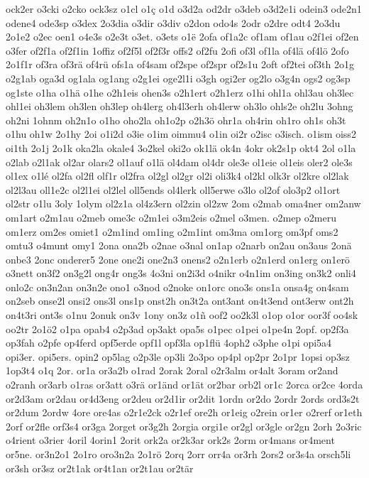 {ock2er
o3cki
o2cko
ock3sz
o1cl
o1ç
o1d
o3d2a
od2dr
o3deb
o3d2e1i
odein3
ode2n1
odene4
ode3sp
o3dex
2o3dia
o3dir
o3div
o2don
odo4s
2odr
o2dre
odt4
2o3du
2o1e2
o2ec
oen1
o4e3s
o2e3t
o3et.
o3ets
o1ë
2ofa
of1a2c
of1am
of1au
o2f1ei
of2en
o3fer
of2f1a
of2f1in
1offiz
of2f5l
of2f3r
offs2
of2fu
2ofi
of3l
of1la
of4lä
of4lö
2ofo
2o1f1r
of3ra
of3rä
of4rü
ofs1a
of4sam
of2spe
of2spr
of2s1u
2oft
of2tei
of3th
2o1g
o2g1ab
oga3d
og1ala
og1ang
o2g1ei
oge2l1i
o3gh
ogi2er
og2lo
o3g4n
ogs2
og3sp
og1ste
o1ha
o1hä
o1he
o2h1eis
ohen3s
o2h1ert
o2h1erz
o1hi
ohl1a
ohl3au
oh3lec
ohl1ei
oh3lem
oh3len
oh3lep
oh4lerg
oh4l3erh
oh4lerw
oh3lo
ohls2e
oh2lu
3ohng
oh2ni
1ohnm
oh2n1o
o1ho
oho2la
oh1o2p
o2h3ö
ohr1a
oh4rin
oh1ro
oh1s
oh3t
o1hu
oh1w
2o1hy
2oi
o1i2d
o3ie
o1im
oimmu4
o1in
oi2r
o2isc
o3isch.
o1ism
oiss2
oi1th
2o1j
2o1k
oka2la
okale4
3o2kel
oki2o
ok1lä
ok4n
4okr
ok2s1p
okt4
2ol
o1la
o2lab
o2l1ak
ol2ar
olars2
ol1auf
o1lä
ol4dam
ol4dr
ole3e
ol1eie
ol1eis
oler2
ole3s
ol1ex
o1lé
ol2fa
ol2fl
olf1r
ol2fra
ol2gl
ol2gr
ol2i
oli3k4
ol2kl
olk3r
ol2kre
ol2lak
ol2l3au
oll1e2c
ol2l1ei
ol2lel
oll5ends
ol4lerk
oll5erwe
o3lo
ol2of
olo3p2
ol1ort
ol2str
o1lu
3oly
1olym
ol2z1a
ol4z3ern
ol2zin
ol2zw
2om
o2mab
oma4ner
om2anw
om1art
o2m1au
o2meb
ome3c
o2m1ei
o3m2eis
o2mel
o3men.
o2mep
o2meru
om1erz
om2es
omiet1
o2m1ind
om1ing
o2m1int
om3ma
om1org
om3pf
oms2
omtu3
o4munt
omy1
2ona
ona2b
o2nae
o3nal
on1ap
o2narb
on2au
on3aus
2onä
onbe3
2onc
onderer5
2one
one2i
one2n3
onens2
o2n1erb
o2n1erd
on1erg
on1erö
o3nett
on3f2
on3g2l
ong4r
ong3s
4o3ni
on2i3d
o4nikr
o4n1im
on3ing
on3k2
onli4
onlo2c
on3n2an
on3n2e
ono1
o3nod
o2noke
on1orc
ono3s
ons1a
onsa4g
on4sam
on2seb
onse2l
onsi2
ons3l
ons1p
onst2h
on3t2a
ont3ant
on4t3end
ont3erw
ont2h
on4t3ri
ont3s
o1nu
2onuk
on3v
1ony
on3z
o1ñ
oof2
oo2k3l
o1op
o1or
oor3f
oo4sk
oo2tr
2o1ö2
o1pa
opab4
o2p3ad
op3akt
opa5s
o1pec
o1pei
o1pe4n
2opf.
op2f3a
op3fah
o2pfe
op4ferd
opf5erde
opf1l
opf3la
op1flü
4oph2
o3phe
o1pi
opi5a4
opi3er.
opi5ers.
opin2
op5lag
o2p3le
op3li
2o3po
op4pl
op2pr
2o1pr
1opsi
op3sz
1op3t4
o1q
2or.
or1a
or3a2b
o1rad
2orak
2oral
o2r3alm
or4alt
3oram
or2and
o2ranh
or3arb
o1ras
or3att
o3rä
or1änd
or1ät
or2bar
orb2l
or1c
2orca
or2ce
4orda
or2d3am
or2dau
or4d3eng
or2deu
or2d1ir
or2dit
1ordn
or2do
2ordr
2ords
ord3s2t
or2dum
2ordw
4ore
ore4as
o2r1e2ck
o2r1ef
ore2h
or1eig
o2rein
or1er
o2rerf
or1eth
2orf
or2fle
orf3s4
or3ga
2orget
or3g2h
2orgia
orgi1e
or2gl
or3gle
or2gn
2orh
2o3ric
o4rient
o3rier
4oril
4orin1
2orit
ork2a
or2k3ar
ork2s
2orm
or4mans
or4ment
or5ne.
or3n2o1
2o1ro
oro3n2a
2o1rö
2orq
2orr
orr4a
or3rh
2ors2
or3s4a
orsch5li
or3sh
or3sz
or2t1ak
or4t1an
or2t1au
or2tär
}
